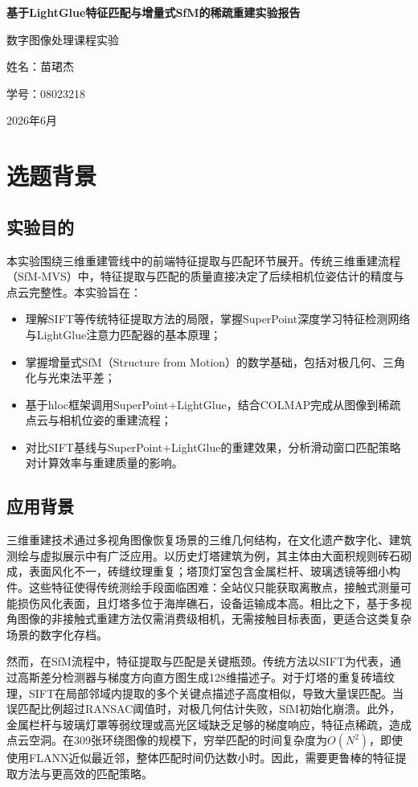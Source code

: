 \documentclass[UTF8,a4paper]{ctexart}
\newcommand{\cover}{
    \begin{titlepage}
    \centering
    \vspace*{5cm}
    {\Huge\bfseries 基于LightGlue特征匹配与增量式SfM的稀疏重建实验报告\par}
    
    \vspace{2cm}
    {\large 数字图像处理课程实验\par}
    

    \vspace{3cm} 
    {\Large 姓名：苗珺杰\par}      
    \vspace{0.5cm} 
    {\Large 学号：08023218\par} 
    \vfill
    

    {\large 2026年6月\par}    
    \end{titlepage}
}
\begin{document}
\cover

\thispagestyle{empty}
\newpage
\tableofcontents
\newpage

\section{选题背景}

\subsection{实验目的}

本实验围绕三维重建管线中的前端特征提取与匹配环节展开。传统三维重建流程（SfM-MVS）中，特征提取与匹配的质量直接决定了后续相机位姿估计的精度与点云完整性。本实验旨在：

\begin{itemize}
    \item 理解SIFT等传统特征提取方法的局限，掌握SuperPoint深度学习特征检测网络与LightGlue注意力匹配器的基本原理；
    \item 掌握增量式SfM（Structure from Motion）的数学基础，包括对极几何、三角化与光束法平差；
    \item 基于hloc框架调用SuperPoint+LightGlue，结合COLMAP完成从图像到稀疏点云与相机位姿的重建流程；
    \item 对比SIFT基线与SuperPoint+LightGlue的重建效果，分析滑动窗口匹配策略对计算效率与重建质量的影响。
\end{itemize}

\subsection{应用背景}

三维重建技术通过多视角图像恢复场景的三维几何结构，在文化遗产数字化、建筑测绘与虚拟展示中有广泛应用。以历史灯塔建筑为例，其主体由大面积规则砖石砌成，表面风化不一，砖缝纹理重复；塔顶灯室包含金属栏杆、玻璃透镜等细小构件。这些特征使得传统测绘手段面临困难：全站仪只能获取离散点，接触式测量可能损伤风化表面，且灯塔多位于海岸礁石，设备运输成本高。相比之下，基于多视角图像的非接触式重建方法仅需消费级相机，无需接触目标表面，更适合这类复杂场景的数字化存档。

然而，在SfM流程中，特征提取与匹配是关键瓶颈。传统方法以SIFT为代表，通过高斯差分检测器与梯度方向直方图生成128维描述子。对于灯塔的重复砖墙纹理，SIFT在局部邻域内提取的多个关键点描述子高度相似，导致大量误匹配。当误匹配比例超过RANSAC阈值时，对极几何估计失败，SfM初始化崩溃。此外，金属栏杆与玻璃灯罩等弱纹理或高光区域缺乏足够的梯度响应，特征点稀疏，造成点云空洞。在309张环绕图像的规模下，穷举匹配的时间复杂度为$O(N^2)$，即使使用FLANN近似最近邻，整体匹配时间仍达数小时。因此，需要更鲁棒的特征提取方法与更高效的匹配策略。
\end{document}
